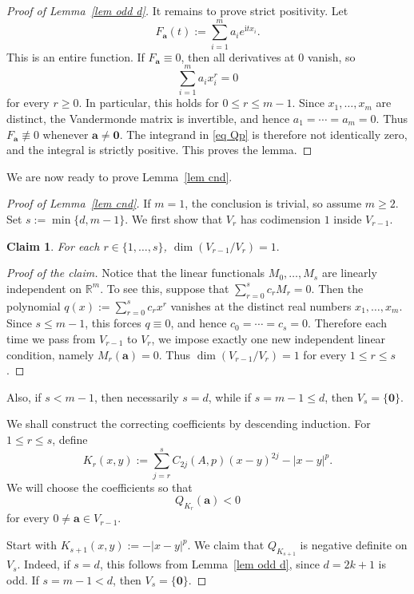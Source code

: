 \documentclass[11pt]{article}
\newtheorem{claim}[theorem]{Claim}
\theoremstyle{definition}
\newenvironment{poc}{\begin{proof}[Proof of the claim]\renewcommand*{\qedsymbol}{$\blacksquare$}}{\end{proof}}
\newcommand{\ii}{\mathrm{i}}
\begin{document}
\begin{proof}[Proof of Lemma~\ref{lem odd d}]
	It remains to prove strict positivity. Let
	\[
	F_{\boldsymbol{a}}(t):=\sum_{i=1}^m a_i e^{\ii tx_i}.
	\]
	This is an entire function. If \(F_{\boldsymbol{a}}\equiv0\), then all derivatives at \(0\) vanish, so
\[
\sum_{i=1}^m a_i x_i^r=0
\]
for every \(r\ge0\). In particular, this holds for \(0\le r\le m-1\). Since \(x_1,\dots,x_m\) are distinct, the Vandermonde matrix is invertible, and hence \(a_1=\cdots=a_m=0\). Thus \(F_{\boldsymbol{a}}\not\equiv0\) whenever \(\boldsymbol{a}\ne\boldsymbol{0}\). The integrand in \eqref{eq Qp} is therefore not identically zero, and the integral is strictly positive. This proves the lemma.
\end{proof}

We are now ready to prove Lemma~\ref{lem cnd}.

\begin{proof}[Proof of Lemma~\ref{lem cnd}]
	If \(m=1\), the conclusion is trivial, so assume \(m\ge2\). Set
\(
s:=\min\{d,m-1\}.
\)
We first show that \(V_r\) has codimension \(1\) inside \(V_{r-1}\).
\begin{claim}\label{claim:CodimOne}
    For each
$r\in\{1,\dots,s\}$, 
\(
\dim(V_{r-1}/V_r)=1.
\)
\end{claim}
\begin{poc}
Notice that the
linear functionals \(M_0,\dots,M_s\) are linearly independent on \(\mathbb R^m\).
To see this, suppose that
\(
\sum_{r=0}^s c_rM_r=0.
\)
Then the polynomial
\(
q(x):=\sum_{r=0}^s c_rx^r
\)
vanishes at the distinct real numbers \(x_1,\dots,x_m\). Since \(s\le m-1\), this
forces \(q\equiv0\), and hence \(c_0=\cdots=c_s=0\). Therefore each time we pass
from \(V_{r-1}\) to \(V_r\), we impose exactly one new independent linear
condition, namely \(M_r(\boldsymbol a)=0\). Thus
\(
\dim(V_{r-1}/V_r)=1
\)
for every \(1\le r\le s\).
\end{poc}
Also, if \(s<m-1\), then necessarily \(s=d\), while if
\(s=m-1\le d\), then \(V_s=\{\boldsymbol0\}\).
	
	We shall construct the correcting coefficients by descending induction. For \(1\le r\le s\), define
\[
K_r(x,y):=\sum_{j=r}^s C_{2j}(A,p)(x-y)^{2j}-|x-y|^p.
\]
We will choose the coefficients so that
\begin{equation}\label{eq:negative_on_Vr_minus_1}
Q_{K_r}(\boldsymbol{a})<0
\end{equation}
for every \(0\ne\boldsymbol{a}\in V_{r-1}\).
	
	Start with
\(
K_{s+1}(x,y):=-|x-y|^p.
\)
We claim that \(Q_{K_{s+1}}\) is negative definite on \(V_s\). Indeed, if \(s=d\), this follows from Lemma~\ref{lem odd d}, since \(d=2k+1\) is odd. If \(s=m-1<d\), then \(V_s=\{\boldsymbol{0}\}\).
	

\end{proof}
\end{document}
